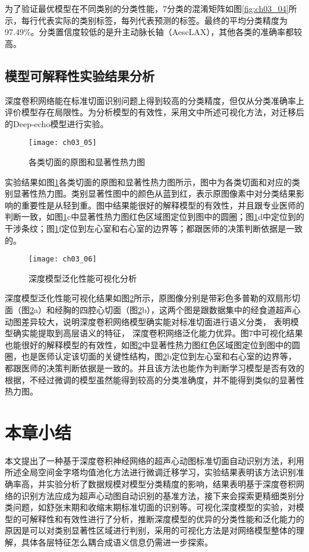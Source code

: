 为了验证最优模型在不同类别的分类性能，7分类的混淆矩阵如图\ref{fig:ch03_04}所示，每行代表实际的类别标签，每列代表预测的标签。最终的平均分类精度为97.49\%。分类置信度较低的是升主动脉长轴（AescLAX），其他各类的准确率都较高。

\subsection{模型可解释性实验结果分析}
深度卷积网络能在标准切面识别问题上得到较高的分类精度，但仅从分类准确率上评价模型存在局限性。为分析模型的有效性，采用文中所述可视化方法，对迁移后的Deep-echo模型进行实验。
\begin{figure}[!htbp]
\centering
\texttt{[image: ch03\_05]}
\caption{各类切面的原图和显著性热力图}
\label{fig:ch03_05}
\end{figure}  
 
实验结果如图\ref{fig:ch03_05}各类切面的原图和显著性热力图所示，图中为各类切面和对应的类别显著性热力图。类别显著性图中的颜色从蓝到红，表示原图像素中对分类结果影响的重要性是从轻到重。图中结果能很好的解释模型的有效性，并且跟专业医师的判断一致，如图\ref{fig:ch03_05}c中显著性热力图红色区域图定位到图中的圆圈；图\ref{fig:ch03_05}d中定位到的干涉条纹；图\ref{fig:ch03_05}f定位到左心室和右心室的边界等；都跟医师的决策判断依据是一致的。
\begin{figure}[!htbp]
\centering
\texttt{[image: ch03\_06]}
\caption{深度模型泛化性能可视化分析}
\label{fig:ch03_06}
\end{figure}  
  
深度模型泛化性能可视化结果如图\ref{fig:ch03_06}所示，原图像分别是带彩色多普勒的双扇形切面（图\ref{fig:ch03_06}a）和经胸的四腔心切面（图\ref{fig:ch03_06}b），这两个图是跟数据集中的经食道超声心动图差异较大，说明深度卷积网络模型确实能对标准切面进行语义分类， 表明模型确实能提取到高层语义的特征， 深度卷积网络泛化能力优异。图7中可视化结果也能很好的解释模型的有效性，如图\ref{fig:ch03_06}中显著性热力图红色区域图定位到图中的圆圈，也是医师认定该切面的关键性结构，图\ref{fig:ch03_06}b定位到左心室和右心室的边界等，都跟医师的决策判断依据是一致的。并且该方法也能作为判断学习模型是否有效的根据，不经过微调的模型虽然能得到较高的分类准确度，并不能得到类似的显著性热力图。

\section{本章小结}

本文提出了一种基于深度卷积神经网络的超声心动图标准切面自动识别方法，利用所述全局空间金字塔均值池化方法进行微调迁移学习，实验结果表明该方法识别准确率高，并实验分析了数据规模对模型分类精度的影响，结果表明基于深度卷积网络的识别方法应成为超声心动图自动识别的基准方法，接下来会探索更精细类别分类问题，如舒张末期和收缩末期标准切面的识别等。可视化深度模型的实验，对模型的可解释性和有效性进行了分析，推断深度模型的优异的分类性能和泛化能力的原因是可以对类别显著性区域进行判别，采用的可视化方法是对网络模型整体的理解，具体各层特征怎么耦合成语义信息仍需进一步探索。




